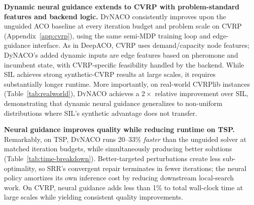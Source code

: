 \documentclass[sigconf]{acmart}
\newcommand{\DyNACO}{\textsc{DyNACO}}
\begin{document}
\smallskip\noindent\textbf{Dynamic neural guidance extends to CVRP with problem-standard features and backend logic.}
\DyNACO{} consistently improves upon the unguided ACO baseline at every iteration budget and problem scale on CVRP (Appendix~\ref{app:cvrp}), using the same semi-MDP training loop and edge-guidance interface. As in DeepACO, CVRP uses demand/capacity node features; DyNACO's added dynamic inputs are edge features based on pheromone and incumbent state, with CVRP-specific feasibility handled by the backend.
While SIL achieves strong synthetic-CVRP results at large scales, it requires substantially longer runtime.
More importantly, on real-world CVRPlib instances (Table~\ref{tab:realworld}), \DyNACO{} achieves a $2{\times}$ relative improvement over SIL, demonstrating that dynamic neural guidance generalizes to non-uniform distributions where SIL's synthetic advantage does not transfer.

\smallskip\noindent\textbf{Neural guidance improves quality while reducing runtime on TSP.}
Remarkably, on TSP, \DyNACO{} runs 20--33\% \emph{faster} than the unguided solver at matched iteration budgets, while simultaneously producing better solutions (Table~\ref{tab:time-breakdown}).
Better-targeted perturbations create less sub-optimality, so SRR's convergent repair terminates in fewer iterations; the neural policy amortizes its own inference cost by reducing downstream local-search work.
On CVRP, neural guidance adds less than 1\% to total wall-clock time at large scales while yielding consistent quality improvements.
\end{document}
